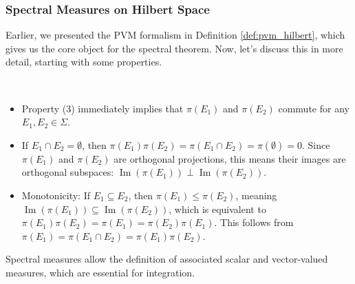\subsubsection{Spectral Measures on Hilbert Space}
\label{subsec:spectral_measure_def}

Earlier, we presented the PVM formalism in Definition \ref{def:pvm_hilbert}, which gives us the core object for the spectral theorem. Now, let's discuss this in more detail, starting with some properties.

\begin{remark}
\,
\begin{itemize}
    \item Property (3) immediately implies that $\pi(E_1)$ and $\pi(E_2)$ commute for any $E_1, E_2 \in \Sigma$.
    \item If $E_1 \cap E_2 = \emptyset$, then $\pi(E_1) \pi(E_2) = \pi(E_1 \cap E_2) = \pi(\emptyset) = 0$. Since $\pi(E_1)$ and $\pi(E_2)$ are orthogonal projections, this means their images are orthogonal subspaces: $\operatorname{Im}(\pi(E_1)) \perp \operatorname{Im}(\pi(E_2))$.
    \item Monotonicity: If $E_1 \subseteq E_2$, then $\pi(E_1) \le \pi(E_2)$, meaning $\operatorname{Im}(\pi(E_1)) \subseteq \operatorname{Im}(\pi(E_2))$, which is equivalent to $\pi(E_1)\pi(E_2) = \pi(E_1) = \pi(E_2)\pi(E_1)$. This follows from $\pi(E_1) = \pi(E_1 \cap E_2) = \pi(E_1)\pi(E_2)$.
\end{itemize}
\end{remark}

Spectral measures allow the definition of associated scalar and vector-valued measures, which are essential for integration.

